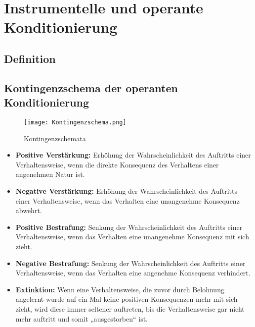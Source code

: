 	\section{Instrumentelle und operante Konditionierung}

		\subsection{Definition}

		\subsection{Kontingenzschema der operanten Konditionierung}
		
		\begin{center}
		\begin{figure}[h]
    \centering
    \texttt{[image: Kontingenzschema.png]}
    \caption{Kontingenzschemata}
		\end{figure}
		\end{center}
		
		\begin{itemize}
			\item \textbf{Positive Verstärkung:} Erhöhung der Wahrscheinlichkeit des Auftritts einer Verhaltensweise, wenn die direkte Konsequenz des Verhaltens einer angenehmen Natur ist. 
			\item \textbf{Negative Verstärkung:} Erhöhung der Wahrscheinlichkeit des Auftritts einer Verhaltensweise, wenn das Verhalten eine unangenehme Konsequenz abwehrt.
			\item \textbf{Positive Bestrafung:} Senkung der Wahrscheinlichkeit des Auftritts einer Verhaltensweise, wenn das Verhalten eine unangenehme Konsequenz mit sich zieht.
			\item \textbf{Negative Bestrafung:} Senkung der Wahrscheinlichkeit des Auftritts einer Verhaltensweise, wenn das Verhalten eine angenehme Konsequenz verhindert. 
			\item \textbf{Extinktion:} Wenn eine Verhaltensweise, die zuvor durch Belohnung angelernt wurde auf ein Mal keine positiven Konsequenzen mehr mit sich zieht, wird diese immer seltener auftreten, bis die Verhaltensweise gar nicht mehr auftritt und somit „ausgestorben“ ist. 
		\end{itemize}
		

